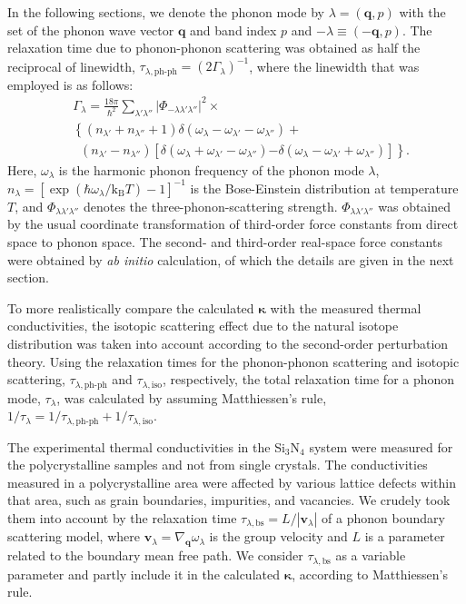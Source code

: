 \documentclass[twocolumn,amsmath,amssymb,a4paper,prb,superscriptaddress,floatfix]{revtex4-1}
\begin{document}
In the following sections, we denote the phonon mode by $\lambda=(\mathbf{q},p)$
with the set of the phonon wave vector $\mathbf{q}$ and band index $p$ and
$-\lambda \equiv (-\mathbf{q},p)$. The relaxation time due to phonon-phonon
scattering was obtained as half the reciprocal of linewidth,
$\tau_{\lambda,\text{ph-ph}}=(2\Gamma_\lambda)^{-1}$, where the linewidth that was
employed is as follows:
\begin{align}
 \label{eq:linewidth}
 &\Gamma_\lambda = \frac{18\pi}{\hbar^2}
  \sum_{\lambda' \lambda''}
  \bigl|\Phi_{-\lambda\lambda'\lambda''}\bigl|^2 \times \nonumber \\ 
 &\left\{ (n_{\lambda'} + n_{\lambda''}+1) 
   \delta(\omega_\lambda-\omega_{\lambda'}-\omega_{\lambda''}) \right.
   + \nonumber \\ 
 &\;\;(n_{\lambda'}-n_{\lambda''})
  \left[\delta(\omega_\lambda +\omega_{\lambda'}-\omega_{\lambda''})
 \right. 
 \left. -\left. \delta(\omega_\lambda - \omega_{\lambda'}+\omega_{\lambda''})
 \right]\right\}.
\end{align}
Here, $\omega_\lambda$ is the harmonic phonon frequency of the phonon mode
$\lambda$, $n_\lambda=[\exp(\hbar\omega_\lambda/\mathrm{k_B}T)-1]^{-1}$ is
the Bose-Einstein distribution at temperature $T$, and
$\Phi_{\lambda\lambda'\lambda''}$ denotes the three-phonon-scattering strength.
$\Phi_{\lambda\lambda'\lambda''}$ was obtained by the usual coordinate
transformation of third-order force constants from direct space to phonon
space.\cite{phono3py} The second- and third-order real-space force constants
were obtained by {\it ab initio} calculation, of which the details are given in the
next section.

To more realistically compare the  calculated $\boldsymbol{\kappa}$ with the
measured thermal conductivities, the isotopic scattering effect due to the natural isotope
distribution was taken into account according to the second-order perturbation
theory.\cite{tamura} Using the relaxation times for the phonon-phonon scattering
and isotopic scattering, $\tau_{\lambda,\text{ph-ph}}$ and
$\tau_{\lambda,\text{iso}}$, respectively, the total relaxation time for a phonon mode,
$\tau_{\lambda}$, was calculated by assuming Matthiessen's rule, 
$1/\tau_{\lambda} = 1/\tau_{\lambda,\text{ph-ph}} +
1/\tau_{\lambda,\text{iso}}$.

The experimental thermal conductivities in the Si$_3$N$_4$ system were
measured for the polycrystalline samples and not from single
crystals. The conductivities measured in a polycrystalline area were affected
by various lattice defects within that area, such as grain boundaries, impurities, and
vacancies. We crudely took them into account by the relaxation time
$\tau_{\lambda,\text{bs}}=L/|\mathbf{v}_\lambda|$ of a phonon boundary
scattering model, where $\mathbf{v}_\lambda = \nabla_{\mathbf{q}}\omega_\lambda$
is the group velocity and $L$ is a parameter related to the boundary mean free
path. We consider $\tau_{\lambda,\text{bs}}$ as a variable parameter and partly
include it in the calculated $\boldsymbol{\kappa}$, according to Matthiessen's rule. 
\end{document}
